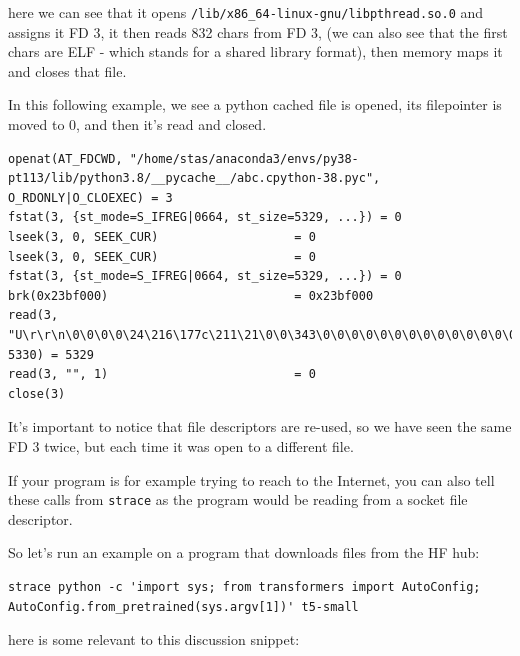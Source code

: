 \documentclass[
]{report}
\begin{document}
here we can see that it opens
\texttt{/lib/x86\_64-linux-gnu/libpthread.so.0} and assigns it FD 3, it
then reads 832 chars from FD 3, (we can also see that the first chars
are ELF - which stands for a shared library format), then memory maps it
and closes that file.

In this following example, we see a python cached file is opened, its
filepointer is moved to 0, and then it's read and closed.

\begin{verbatim}
openat(AT_FDCWD, "/home/stas/anaconda3/envs/py38-pt113/lib/python3.8/__pycache__/abc.cpython-38.pyc", O_RDONLY|O_CLOEXEC) = 3
fstat(3, {st_mode=S_IFREG|0664, st_size=5329, ...}) = 0
lseek(3, 0, SEEK_CUR)                   = 0
lseek(3, 0, SEEK_CUR)                   = 0
fstat(3, {st_mode=S_IFREG|0664, st_size=5329, ...}) = 0
brk(0x23bf000)                          = 0x23bf000
read(3, "U\r\r\n\0\0\0\0\24\216\177c\211\21\0\0\343\0\0\0\0\0\0\0\0\0\0\0\0\0\0\0"..., 5330) = 5329
read(3, "", 1)                          = 0
close(3)
\end{verbatim}

It's important to notice that file descriptors are re-used, so we have
seen the same FD 3 twice, but each time it was open to a different file.

If your program is for example trying to reach to the Internet, you can
also tell these calls from \texttt{strace} as the program would be
reading from a socket file descriptor.

So let's run an example on a program that downloads files from the HF
hub:

\begin{verbatim}
strace python -c 'import sys; from transformers import AutoConfig; AutoConfig.from_pretrained(sys.argv[1])' t5-small
\end{verbatim}

here is some relevant to this discussion snippet:
\end{document}
